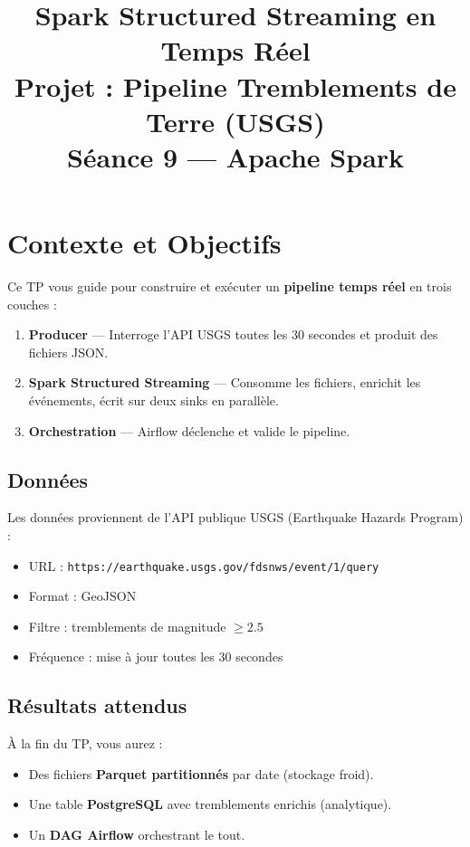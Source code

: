 \documentclass[12pt, a4paper]{article}
\title{%
  \textbf{Spark Structured Streaming en Temps Réel} \\
  \vspace{0.5cm}
  \large Projet : Pipeline Tremblements de Terre (USGS) \\
  \vspace{0.3cm}
  \normalsize Séance 9 — Apache Spark
}
\author{}
\date{}
\begin{document}
\maketitle

\tableofcontents

\newpage

\section{Contexte et Objectifs}

Ce TP vous guide pour construire et exécuter un \textbf{pipeline temps réel} en trois couches :

\begin{enumerate}
  \item \textbf{Producer} — Interroge l'API USGS toutes les 30 secondes et produit des fichiers JSON.
  \item \textbf{Spark Structured Streaming} — Consomme les fichiers, enrichit les événements, écrit sur deux sinks en parallèle.
  \item \textbf{Orchestration} — Airflow déclenche et valide le pipeline.
\end{enumerate}

\subsection{Données}
Les données proviennent de l'API publique USGS (Earthquake Hazards Program) :
\begin{itemize}
  \item URL : \texttt{https://earthquake.usgs.gov/fdsnws/event/1/query}
  \item Format : GeoJSON
  \item Filtre : tremblements de magnitude $\geq 2.5$
  \item Fréquence : mise à jour toutes les 30 secondes
\end{itemize}

\subsection{Résultats attendus}
À la fin du TP, vous aurez :
\begin{itemize}
  \item Des fichiers \textbf{Parquet partitionnés} par date (stockage froid).
  \item Une table \textbf{PostgreSQL} avec tremblements enrichis (analytique).
  \item Un \textbf{DAG Airflow} orchestrant le tout.
\end{itemize}
\end{document}
